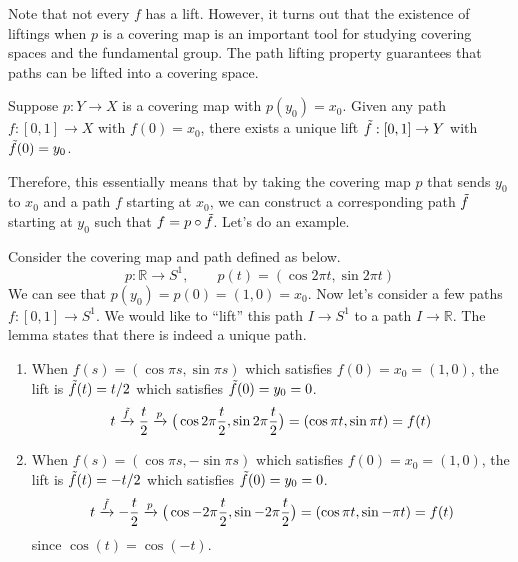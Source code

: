   Note that not every $f$ has a lift. However, it turns out that the existence of liftings when $p$ is a covering map is an important tool for studying covering spaces and the fundamental group. The path lifting property guarantees that paths can be lifted into a covering space. 

  \begin{lemma}
    Suppose $p: Y \to X$ is a covering map with $p(y_0) = x_0$. Given any path $f: [0, 1] \to X$ with $f(0) = x_0$, there exists a unique lift $\Tilde{f}: [0, 1] \to Y$ with $\Tilde{f}(0) = y_0$. 
  \end{lemma}

  Therefore, this essentially means that by taking the covering map $p$ that sends $y_0$ to $x_0$ and a path $f$ starting at $x_0$, we can construct a corresponding path $\Tilde{f}$ starting at $y_0$ such that $f = p \circ \Tilde{f}$. Let's do an example. 

  \begin{example}
    Consider the covering map and path defined as below. 
    \begin{equation}
      p: \mathbb{R} \to S^1, \qquad p(t) = (\cos{2 \pi t}, \sin{2 \pi t}) 
    \end{equation}
    We can see that $p(y_0) = p(0) = (1, 0) = x_0$. Now let's consider a few paths $f: [0, 1] \to S^1$. We would like to ``lift'' this path $I \to S^1$ to a path $I \to \mathbb{R}$. The lemma states that there is indeed a unique path. 
    \begin{enumerate}
      \item When $f(s) = (\cos{\pi s}, \sin{\pi s})$ which satisfies $f(0) = x_0 = (1, 0)$, the lift is $\Tilde{f}(t) = t/2$ which satisfies $\Tilde{f}(0) = y_0 = 0$. 
      \begin{equation}
        t \xrightarrow{\Tilde{f}} \frac{t}{2} \xrightarrow{p} \big( \cos{2 \pi \frac{t}{2}}, \sin{2 \pi \frac{t}{2}} \big) = ( \cos{\pi t}, \sin{\pi t}) = f(t)
      \end{equation}

      \item When $f(s) = (\cos{\pi s}, -\sin{\pi s})$ which satisfies $f(0) = x_0 = (1, 0)$, the lift is $\Tilde{f}(t) = -t/2$ which satisfies $\Tilde{f}(0) = y_0 = 0$. 
      \begin{equation}
        t \xrightarrow{\Tilde{f}} -\frac{t}{2} \xrightarrow{p} \big( \cos{-2 \pi \frac{t}{2}}, \sin{-2 \pi \frac{t}{2}} \big) = ( \cos{\pi t}, \sin{-\pi t}) = f(t)
      \end{equation}
      since $\cos(t) = \cos(-t)$. 
    \end{enumerate}

    \begin{figure}[H]
      \centering 
      \caption{} 
      \label{fig:lift_ex}
    \end{figure}
  \end{example}

